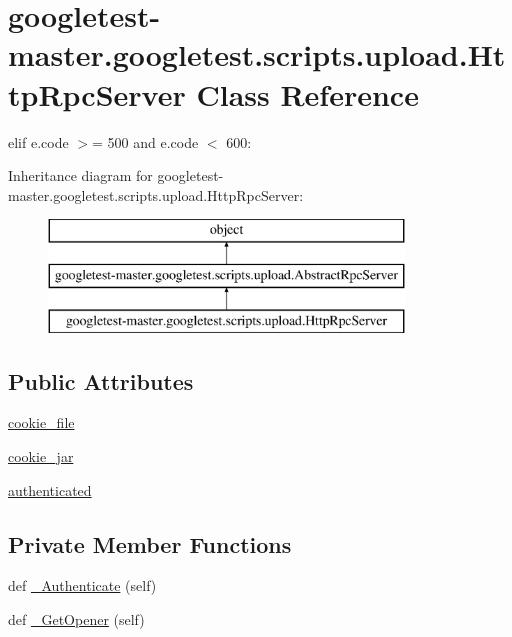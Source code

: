 \hypertarget{classgoogletest-master_1_1googletest_1_1scripts_1_1upload_1_1_http_rpc_server}{}\section{googletest-\/master.googletest.\+scripts.\+upload.\+Http\+Rpc\+Server Class Reference}
\label{classgoogletest-master_1_1googletest_1_1scripts_1_1upload_1_1_http_rpc_server}


elif e.\+code $>$= 500 and e.\+code $<$ 600\+:  


Inheritance diagram for googletest-\/master.googletest.\+scripts.\+upload.\+Http\+Rpc\+Server\+:\begin{figure}[H]
\begin{center}
\leavevmode
\includegraphics[height=3.000000cm]{d8/d57/classgoogletest-master_1_1googletest_1_1scripts_1_1upload_1_1_http_rpc_server}
\end{center}
\end{figure}
\subsection*{Public Attributes}
\begin{DoxyCompactItemize}
\item 
\mbox{\hyperlink{classgoogletest-master_1_1googletest_1_1scripts_1_1upload_1_1_http_rpc_server_a09e1a755aedf7a2904ca0ce755bac3ae}{cookie\+\_\+file}}
\item 
\mbox{\hyperlink{classgoogletest-master_1_1googletest_1_1scripts_1_1upload_1_1_http_rpc_server_a448328bf6903363f8389fcd3129fcb17}{cookie\+\_\+jar}}
\item 
\mbox{\hyperlink{classgoogletest-master_1_1googletest_1_1scripts_1_1upload_1_1_http_rpc_server_af5bca2805562c5627585c537fb7ad262}{authenticated}}
\end{DoxyCompactItemize}
\subsection*{Private Member Functions}
\begin{DoxyCompactItemize}
\item 
def \mbox{\hyperlink{classgoogletest-master_1_1googletest_1_1scripts_1_1upload_1_1_http_rpc_server_a9b7c7d5f1d0af70343bc097c989e0e39}{\+\_\+\+Authenticate}} (self)
\item 
def \mbox{\hyperlink{classgoogletest-master_1_1googletest_1_1scripts_1_1upload_1_1_http_rpc_server_a32e41ee17da48e04087afd61fc451c74}{\+\_\+\+Get\+Opener}} (self)
\end{DoxyCompactItemize}
